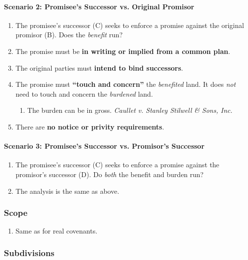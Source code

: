 \paragraph{Scenario 2: Promisee's Successor vs. Original Promisor}

\begin{enumerate}
    \item The promisee's successor (C) seeks to enforce a promise against the 
    original promisor (B). Does the \emph{benefit} run?
    \item The promise must be \textbf{in writing or implied from a common 
    plan}.
    \item The original parties must \textbf{intend to bind successors}.
    \item The promise must \textbf{``touch and concern''} the \emph{benefited} 
    land. It does \emph{not} need to touch and concern the \emph{burdened} 
    land.
    \begin{enumerate}
        \item The burden can be in gross. \emph{Caullet v. Stanley Stilwell \& 
        Sons, Inc.}
    \end{enumerate}
    \item There are \textbf{no notice or privity requirements}.
\end{enumerate}

\paragraph{Scenario 3: Promisee's Successor vs. Promisor's Successor}

\begin{enumerate}
    \item The promisee's successor (C) seeks to enforce a promise against the 
    promisor's successor (D). Do \emph{both} the benefit and burden run?
    \item The analysis is the same as above.
\end{enumerate}

\subsubsection{Scope}

\begin{enumerate}
    \item Same as for real covenants.
\end{enumerate}

\subsubsection{Subdivisions}

